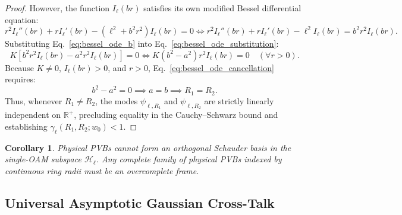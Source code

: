 \documentclass{optica-article}
\newtheorem{corollary}{Corollary}
\begin{document}
\begin{proof}
However, the function $I_\ell(b r)$ satisfies its own modified Bessel differential equation:
\begin{equation}
r^2 I_\ell''(b r) + r I_\ell'(b r) - (\ell^2 + b^2 r^2) I_\ell(b r) = 0 \iff r^2 I_\ell''(b r) + r I_\ell'(b r) - \ell^2 I_\ell(b r) = b^2 r^2 I_\ell(b r).
\label{eq:bessel_ode_b}
\end{equation}
Substituting Eq.~\eqref{eq:bessel_ode_b} into Eq.~\eqref{eq:bessel_ode_substitution}:
\begin{equation}
K \left[ b^2 r^2 I_\ell(b r) - a^2 r^2 I_\ell(b r) \right] = 0 \iff K (b^2 - a^2) r^2 I_\ell(b r) = 0 \quad (\forall r > 0).
\label{eq:bessel_ode_cancellation}
\end{equation}
Because $K \neq 0$, $I_\ell(b r) > 0$, and $r > 0$, Eq.~\eqref{eq:bessel_ode_cancellation} requires:
\begin{equation}
b^2 - a^2 = 0 \implies a = b \implies R_1 = R_2.
\label{eq:ode_conclusion}
\end{equation}
Thus, whenever $R_1 \neq R_2$, the modes $\psi_{\ell, R_1}$ and $\psi_{\ell, R_2}$ are strictly linearly independent on $\mathbb{R}^+$, precluding equality in the Cauchy--Schwarz bound and establishing $\gamma_\ell(R_1, R_2; w_0) < 1$.
\end{proof}

\begin{corollary}
Physical PVBs cannot form an orthogonal Schauder basis in the single-OAM subspace $\mathcal{H}_\ell$. Any complete family of physical PVBs indexed by continuous ring radii must be an overcomplete frame.
\end{corollary}

\subsection{Universal Asymptotic Gaussian Cross-Talk}
\end{document}
